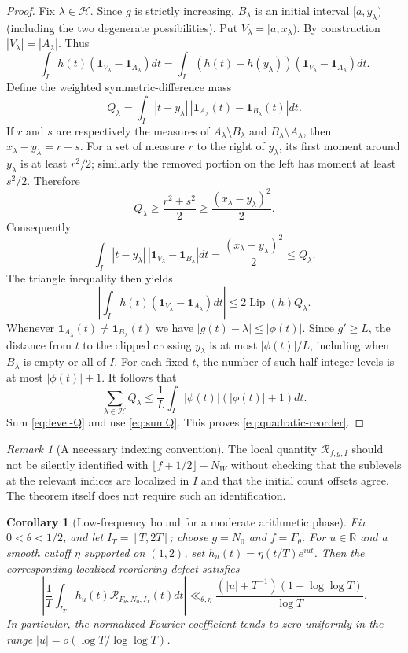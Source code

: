 \documentclass[11pt,leqno]{amsart}
\numberwithin{equation}{section}
\newtheorem{corollary}[theorem]{Corollary}
\theoremstyle{definition}
\theoremstyle{remark}
\newtheorem{remark}[theorem]{Remark}
\newcommand{\R}{\mathbb R}
\newcommand{\1}{\mathbf 1}
\newcommand{\floor}[1]{\lfloor #1\rfloor}
\newcommand{\LP}{\operatorname{Lip}}
\begin{document}
\begin{proof}
Fix $\lambda\in\mathscr H$. Since $g$ is strictly increasing, $B_\lambda$ is an initial interval $[a,y_\lambda)$ (including the two degenerate possibilities). Put $V_\lambda=[a,x_\lambda)$. By construction $|V_\lambda|=|A_\lambda|$. Thus
\[
 \int_Ih(t)(\1_{V_\lambda}-\1_{A_\lambda})dt
 =\int_I(h(t)-h(y_\lambda))(\1_{V_\lambda}-\1_{A_\lambda})dt.
\]
Define the weighted symmetric-difference mass
\[
 Q_\lambda=\int_I|t-y_\lambda|\,|\1_{A_\lambda}(t)-\1_{B_\lambda}(t)|dt.
\]
If $r$ and $s$ are respectively the measures of $A_\lambda\setminus B_\lambda$ and $B_\lambda\setminus A_\lambda$, then $x_\lambda-y_\lambda=r-s$. For a set of measure $r$ to the right of $y_\lambda$, its first moment around $y_\lambda$ is at least $r^2/2$; similarly the removed portion on the left has moment at least $s^2/2$. Therefore
\begin{equation}\label{eq:Qdelta}
 Q_\lambda\ge\frac{r^2+s^2}{2}\ge\frac{(x_\lambda-y_\lambda)^2}{2}.
\end{equation}
Consequently
\[
 \int_I|t-y_\lambda|\,|\1_{V_\lambda}-\1_{B_\lambda}|dt
 =\frac{(x_\lambda-y_\lambda)^2}{2}\le Q_\lambda.
\]
The triangle inequality then yields
\begin{equation}\label{eq:level-Q}
 \left|\int_Ih(t)(\1_{V_\lambda}-\1_{A_\lambda})dt\right|
 \le2\LP(h)Q_\lambda.
\end{equation}
Whenever $\1_{A_\lambda}(t)\ne\1_{B_\lambda}(t)$ we have $|g(t)-\lambda|\le|\phi(t)|$. Since $g'\ge L$, the distance from $t$ to the clipped crossing $y_\lambda$ is at most $|\phi(t)|/L$, including when $B_\lambda$ is empty or all of $I$. For each fixed $t$, the number of such half-integer levels is at most $|\phi(t)|+1$. It follows that
\begin{equation}\label{eq:sumQ}
 \sum_{\lambda\in\mathscr H}Q_\lambda
 \le\frac1L\int_I|\phi(t)|(|\phi(t)|+1)dt.
\end{equation}
Sum \eqref{eq:level-Q} and use \eqref{eq:sumQ}. This proves \eqref{eq:quadratic-reorder}.
\end{proof}
\begin{remark}[A necessary indexing convention]\label{rem:local-index}
The local quantity $\mathcal R_{f,g,I}$ should not be silently identified with $\floor{f+1/2}-N_W$ without checking that the sublevels at the relevant indices are localized in $I$ and that the initial count offsets agree. The theorem itself does not require such an identification.
\end{remark}
\begin{corollary}[Low-frequency bound for a moderate arithmetic phase]\label{cor:reorder-application}
Fix $0<\theta<1/2$, and let $I_T=[T,2T]$; choose $g=N_0$ and $f=F_\theta$. For $u\in\R$ and a smooth cutoff $\eta$ supported on $(1,2)$, set $h_u(t)=\eta(t/T)e^{iut}$. Then the corresponding localized reordering defect satisfies
\begin{equation}\label{eq:lowfreq-reorder}
 \boxed{\left|\frac1T\int_{I_T}h_u(t)\mathcal R_{F_\theta,N_0,I_T}(t)dt\right|
 \ll_{\theta,\eta}\frac{(|u|+T^{-1})(1+\log\log T)}{\log T}.}
\end{equation}
In particular, the normalized Fourier coefficient tends to zero uniformly in the range $|u|=o(\log T/\log\log T)$.
\end{corollary}
\end{document}
